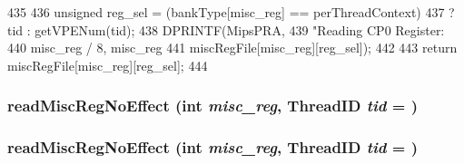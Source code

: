 \begin{DoxyCode}
435 {
436     unsigned reg_sel = (bankType[misc_reg] == perThreadContext)
437         ? tid : getVPENum(tid);
438     DPRINTF(MipsPRA,
439             "Reading CP0 Register:%
440             misc_reg / 8, misc_reg %
441             miscRegFile[misc_reg][reg_sel]);
442 
443     return miscRegFile[misc_reg][reg_sel];
444 }
\end{DoxyCode}
\hypertarget{classMipsISA_1_1ISA_af2ec8925148a53b9bddefb7fb65a7223}{
\subsubsection[{readMiscRegNoEffect}]{ readMiscRegNoEffect (int {\em misc\_\-reg}, \/  {\bf ThreadID} {\em tid} = {})}}
\label{classMipsISA_1_1ISA_af2ec8925148a53b9bddefb7fb65a7223}
\hypertarget{classMipsISA_1_1ISA_af2ec8925148a53b9bddefb7fb65a7223}{
\subsubsection[{readMiscRegNoEffect}]{ readMiscRegNoEffect (int {\em misc\_\-reg}, \/  {\bf ThreadID} {\em tid} = {})}}
\label{classMipsISA_1_1ISA_af2ec8925148a53b9bddefb7fb65a7223}



